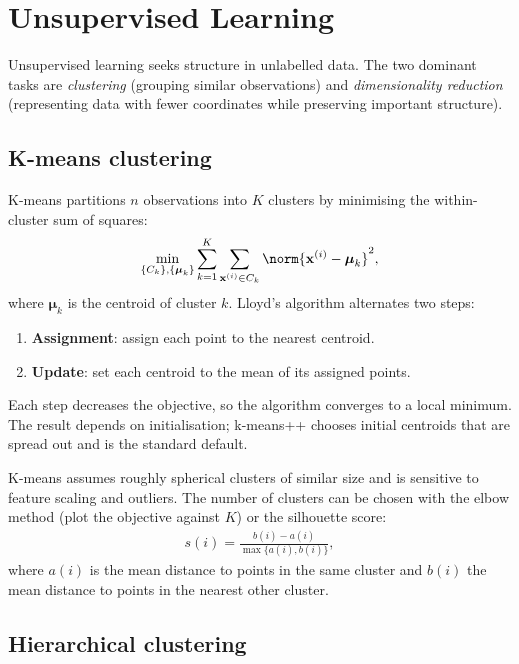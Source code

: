 \documentclass[a4paper, 12pt]{book}
\begin{document}

\chapter{Unsupervised Learning}
\label{ch:unsupervised}

Unsupervised learning seeks structure in unlabelled data. The two dominant tasks are
\emph{clustering} (grouping similar observations) and \emph{dimensionality reduction}
(representing data with fewer coordinates while preserving important structure).

\section{K-means clustering}

K-means partitions $n$ observations into $K$ clusters by minimising the within-cluster
sum of squares:
\begin{align}
    \min_{\{C_k\},\{\boldsymbol{\mu}_k\}}
    \sum_{k=1}^K \sum_{\mathbf{x}^{(i)} \in C_k}
    \norm{\mathbf{x}^{(i)} - \boldsymbol{\mu}_k}^2,
\end{align}
where $\boldsymbol{\mu}_k$ is the centroid of cluster $k$. Lloyd's algorithm
alternates two steps:
\begin{enumerate}
    \item \textbf{Assignment}: assign each point to the nearest centroid.
    \item \textbf{Update}: set each centroid to the mean of its assigned points.
\end{enumerate}
Each step decreases the objective, so the algorithm converges to a local minimum. The
result depends on initialisation; k-means++ chooses initial centroids that are spread
out and is the standard default.

K-means assumes roughly spherical clusters of similar size and is sensitive to
feature scaling and outliers. The number of clusters can be chosen with the elbow
method (plot the objective against $K$) or the silhouette score:
\begin{align}
    s(i) = \frac{b(i)-a(i)}{\max\{a(i),b(i)\}},
\end{align}
where $a(i)$ is the mean distance to points in the same cluster and $b(i)$ the mean
distance to points in the nearest other cluster.

\section{Hierarchical clustering}
\end{document}
